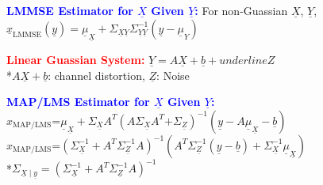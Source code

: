 \documentclass[5pt]{extarticle} %
\begin{document}
\begin{paracol}{3}
{    \textcolor{blue}{\textbf{LMMSE Estimator for $\underline{X}$ Given $\underline{Y}$:}} For non-Guassian $\underline{X}$, $\underline{Y}$, \\
    $\hat{\underline{x}}_{\text{LMMSE}}(\underline{y}) = \underline{\mu}_{\underline{X}} + \Sigma_{\underline{X} \underline{Y}} \Sigma_{\underline{Y} \underline{Y}}^{-1} (\underline{y} - \underline{\mu}_Y)$  

    \textcolor{red}{\textbf{Linear Guassian System:}} $\underline{Y} = A \underline{X} + \underline{b} + underline{Z}$ \\
    *$A\underline{X} + \underline{b}$: channel distortion, $\underline{Z}$: Noise 
    
    \textcolor{blue}{\textbf{MAP/LMS Estimator for $\underline{X}$ Given $\underline{Y}$:}} \\
    $\hat{x}_{\text{MAP/LMS}} \text{=} \underline{\mu}_{\underline{X}} + \Sigma_{\underline{X}} A^T (A \Sigma_{\underline{X}} A^T \text{+} \Sigma_{\underline{Z}})^{-1} (\underline{y} - A \underline{\mu}_{\underline{X}} - \underline{b})$ \\
    $\hat{x}_{\text{MAP/LMS}} \text{=} \left(\Sigma_{\underline{X}}^{-1} + A^T \Sigma_{\underline{Z}}^{-1} A \right)^{-1} \left(A^T \Sigma_{\underline{Z}}^{-1} (\underline{y} - \underline{b}) + \Sigma_{\underline{X}}^{-1} \underline{\mu}_{\underline{X}} \right)$ \\
    *$\Sigma_{\underline{X} \mid \underline{y}} = \left(\Sigma_{\underline{X}}^{-1} + A^T \Sigma_{\underline{Z}}^{-1} A \right)^{-1}$



    }
\end{paracol}
\end{document}
